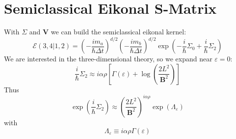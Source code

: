 \section{Semiclassical Eikonal S-Matrix}
With $\Sigma$ and $\mathbf{V}$ we can build the semiclassical eikonal kernel:
\begin{equation}
	\mathcal{E}(3,4|1,2) = \left(- \frac{i m_{a}}{\hbar \Delta t} \right)^{d/2} \left(- \frac{i m_{b}}{\hbar \Delta t} \right)^{d/2} \exp{\left(- \frac{i}{\hbar} \Sigma_{0} + \frac{i}{\hbar} \Sigma_{2} \right)}
\end{equation}
We are interested in the three-dimensional theory, so we expand near $\varepsilon = 0$:
\begin{equation}
	\frac{i}{\hbar} \Sigma_{2} \approx i \alpha \rho \left[ \Gamma(\varepsilon) + \log{\left( \frac{2 L^{2}}{\mathbf{B}^{2}} \right)} \right]
\end{equation}
Thus
\begin{equation}
	\exp{\left( \frac{i}{\hbar} \Sigma_{2} \right)} \approx \left( \frac{2 L^{2}}{\mathbf{B}^{2}} \right)^{i \alpha \rho} \exp{\left( \Lambda_{\varepsilon} \right)}
\end{equation}
with
\begin{equation}
	\Lambda_{\varepsilon} \equiv i \alpha \rho \Gamma(\varepsilon)
\end{equation}


